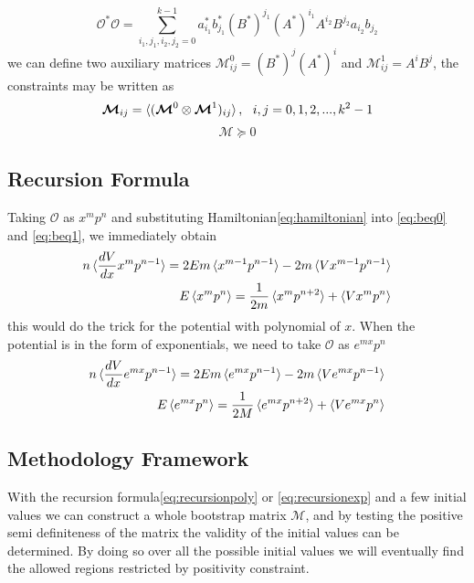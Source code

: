 \documentclass[aps, preprint,amsmath, amssymb]{revtex4-2}
\begin{document}
\begin{equation}
    \mathcal{O}^* \mathcal{O} = \sum_{i_1, j_1, i_2, j_2 = 0}^{k - 1} a_{i_1}^* b_{j_1}^* (B^*)^{j_1} (A^*)^{i_1} A^{i_2} B^{j_2} a_{i_2} b_{j_2}
\end{equation}
we can define two auxiliary matrices $\bm{\mathcal{M}}_{ij}^0 = (B^*)^j (A^*)^i$ and $\bm{\mathcal{M}}_{ij}^1 = A^i B^j$, the constraints may be written as
\begin{equation}
    \bm{\mathcal{M}}_{ij} = \braket{(\bm{\mathcal{M}}^0 \otimes \bm{\mathcal{M}}^1)_{ij}}, \ \ i, j = 0, 1, 2, ..., k^2 - 1
\end{equation}
\begin{equation}
    \bm{\mathcal{M}} \succeq 0
\end{equation}

\subsection{Recursion Formula}
Taking $\mathcal{O}$ as $x^m p^n$ and substituting Hamiltonian\eqref{eq:hamiltonian} into \eqref{eq:beq0} and \eqref{eq:beq1}, we immediately obtain
\begin{align}
    n \braket{\frac{d V}{d x} x^m p^{n - 1}} = 2E m \braket{x^{m - 1} p^{n - 1}} - 2m\braket{V x^{m - 1} p^{n - 1}} \notag \\
    E\braket{x^m p^n} = \frac1{2m}\braket{x^m p^{n + 2}} + \braket{V x^m p^n} \label{eq:recursionpoly}
\end{align}
this would do the trick for the potential with polynomial of $x$. When the potential is in the form of exponentials, we need to take $\mathcal{O}$ as $e^{mx} p^n$
\begin{align}
    n \braket{\frac{d V}{d x} e^{m x} p^{n - 1}} = 2Em\braket{e^{mx} p^{n - 1}} - 2m\braket{V e^{mx} p^{n - 1}}\notag \\
    E \braket{e^{mx} p^n} = \frac1{2M}\braket{e^{mx} p^{n + 2}} + \braket{Ve^{mx} p^n} \label{eq:recursionexp}
\end{align}

\subsection{Methodology Framework}
With the recursion formula\eqref{eq:recursionpoly} or \eqref{eq:recursionexp} and a few initial values we can construct a whole bootstrap matrix $\bm{\mathcal{M}}$, and by testing the positive semi definiteness of the matrix the validity of the initial values can be determined. By doing so over all the possible initial values we will eventually find the allowed regions restricted by positivity constraint.
\end{document}
